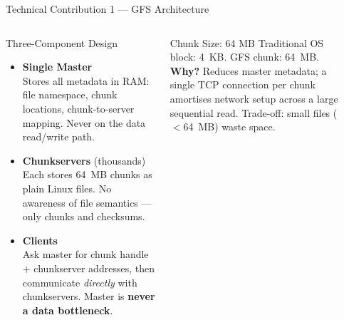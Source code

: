\documentclass[aspectratio=169,10pt]{beamer}
\begin{document}
\begin{frame}{Technical Contribution 1 — GFS Architecture}
  \begin{columns}[T]
      \begin{block}{Three-Component Design}
        \begin{itemize}
          \item \textbf{Single Master}\\
                Stores all metadata in RAM:
                file namespace, chunk locations, chunk-to-server mapping.
                Never on the data read/write path.
          \item \textbf{Chunkservers} (thousands)\\
                Each stores 64~MB chunks as plain Linux files.
                No awareness of file semantics — only chunks and checksums.
          \item \textbf{Clients}\\
                Ask master for chunk handle + chunkserver addresses,
                then communicate \emph{directly} with chunkservers.
                Master is \textbf{never a data bottleneck}.
        \end{itemize}
      \end{block}
      \vspace{5pt}
      \begin{alertblock}{Chunk Size: 64 MB}
        Traditional OS block: 4~KB. GFS chunk: 64~MB.\\
        \textbf{Why?} Reduces master metadata; a single TCP connection
        per chunk amortises network setup across a large sequential read.
        Trade-off: small files ($<$64~MB) waste space.
      \end{alertblock}

      \begin{center}
\end{center}
\end{columns}
\end{frame}
\end{document}
